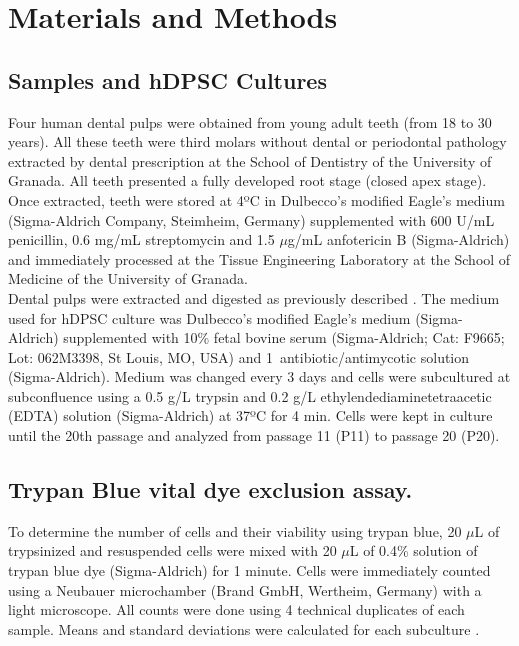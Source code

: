 \documentclass[a4paper,12pt]{article}
\begin{document}
\section{Materials and Methods}
\subsection{Samples and hDPSC Cultures}
Four human dental pulps were obtained from young adult teeth (from 18 to 30 years). All these teeth were third molars without dental or periodontal pathology extracted by dental prescription at the School of Dentistry of the University of Granada. All teeth presented a fully developed root stage (closed apex stage).\\
Once extracted, teeth were stored at 4ºC in Dulbecco’s modified Eagle’s medium (Sigma-Aldrich Company, Steimheim, Germany) supplemented with 600 U/mL penicillin, 0.6 mg/mL streptomycin and 1.5 $\mu$g/mL anfotericin B (Sigma-Aldrich) and immediately processed at the Tissue Engineering Laboratory at the School of Medicine of the University of Granada.\\

Dental pulps were extracted and digested as previously described \cite{RN206}. The medium used for hDPSC culture was Dulbecco’s modified Eagle’s medium (Sigma-Aldrich) supplemented with 10\% fetal bovine serum (Sigma-Aldrich; Cat: F9665; Lot: 062M3398, St Louis, MO, USA) and 1\ antibiotic/antimycotic solution (Sigma-Aldrich). Medium was changed every 3 days and cells were subcultured at subconfluence using a 0.5 g/L trypsin and 0.2 g/L ethylendediaminetetraacetic (EDTA) solution (Sigma-Aldrich) at 37ºC for 4 min. Cells were kept in culture until the 20th passage and analyzed from passage 11 (P11) to passage 20 (P20).\\
\subsection{Trypan Blue vital dye exclusion assay.}
To determine the number of cells and their viability using trypan blue, 20 $\mu$L of trypsinized and resuspended cells were mixed with 20 $\mu$L of 0.4\% solution of trypan blue dye (Sigma-Aldrich) for 1 minute. Cells were immediately counted using a Neubauer microchamber (Brand GmbH, Wertheim, Germany) with a light microscope. All counts were done using 4 technical duplicates of each sample. Means and standard deviations were calculated for each subculture \cite{RN211}.\\
\end{document}
